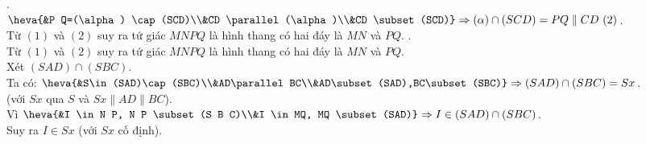 \begin{ex}
{\begin{itemchoice}
			 .\\
			$\heva{&P Q=(\alpha) \cap(SCD)\\&CD \parallel (\alpha)\\&CD  \subset(SCD)}
			 \Rightarrow(\alpha) \cap(SCD)=P Q \parallel CD~(2)$.\\
			Từ $(1)$  và $(2)$ suy ra tứ giác $MNPQ$ là hình thang có hai đáy là $MN$ và $PQ$.
			.\\
			Từ $(1)$ và $(2)$ suy ra tứ giác $MNPQ$ là hình thang có hai  đáy là $MN$ và $PQ$.\\
			Xét $(SAD)\cap(SBC)$.\\ 
			 Ta có: $\heva{&S\in(SAD)\cap(SBC)\\&AD\parallel BC\\&AD\subset(SAD),BC\subset(SBC)}\Rightarrow(SAD)\cap(SBC)=Sx$.\\
			(với $Sx$ qua $S$ và $Sx\parallel AD\parallel  BC$).\\
			Vì  $\heva{&I \in N P, N P \subset(S B C)\\&I \in MQ, MQ \subset(SAD)}\Rightarrow I \in(SAD) \cap(SBC)$.\\
			Suy ra $I\in Sx$  (với $Sx$ cố định).
		\end{itemchoice}
	} 
\end{ex}



